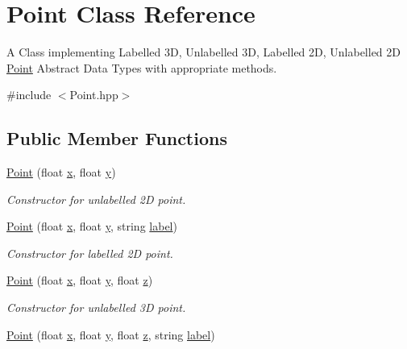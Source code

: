 \hypertarget{class_point}{}\section{Point Class Reference}
\label{class_point}


A Class implementing Labelled 3D, Unlabelled 3D, Labelled 2D, Unlabelled 2D \mbox{\hyperlink{class_point}{Point}} Abstract Data Types with appropriate methods.  




{\ttfamily \#include $<$Point.\+hpp$>$}

\subsection*{Public Member Functions}
\begin{DoxyCompactItemize}
\item 
\mbox{\hyperlink{class_point_a30bc8409287de4f43e160664be834636}{Point}} (float \mbox{\hyperlink{class_point_a05dfe2dfbde813ad234b514f30e662f1}{x}}, float \mbox{\hyperlink{class_point_a6101960c8d2d4e8ea1d32c9234bbeb8d}{y}})
\begin{DoxyCompactList}\small\item\em Constructor for unlabelled 2D point. \end{DoxyCompactList}\item 
\mbox{\hyperlink{class_point_aede82dc8eff80efec382853ecd2d31b0}{Point}} (float \mbox{\hyperlink{class_point_a05dfe2dfbde813ad234b514f30e662f1}{x}}, float \mbox{\hyperlink{class_point_a6101960c8d2d4e8ea1d32c9234bbeb8d}{y}}, string \mbox{\hyperlink{class_point_a1e929419353f9bec46732af977adb55a}{label}})
\begin{DoxyCompactList}\small\item\em Constructor for labelled 2D point. \end{DoxyCompactList}\item 
\mbox{\hyperlink{class_point_a405838cb39b8fb6119633d9ba7e6b4fb}{Point}} (float \mbox{\hyperlink{class_point_a05dfe2dfbde813ad234b514f30e662f1}{x}}, float \mbox{\hyperlink{class_point_a6101960c8d2d4e8ea1d32c9234bbeb8d}{y}}, float \mbox{\hyperlink{class_point_a9a666531e0e99adff132be93d2407d0c}{z}})
\begin{DoxyCompactList}\small\item\em Constructor for unlabelled 3D point. \end{DoxyCompactList}\item 
\mbox{\hyperlink{class_point_a1336b3425f9c080d170f036c336eaa64}{Point}} (float \mbox{\hyperlink{class_point_a05dfe2dfbde813ad234b514f30e662f1}{x}}, float \mbox{\hyperlink{class_point_a6101960c8d2d4e8ea1d32c9234bbeb8d}{y}}, float \mbox{\hyperlink{class_point_a9a666531e0e99adff132be93d2407d0c}{z}}, string \mbox{\hyperlink{class_point_a1e929419353f9bec46732af977adb55a}{label}})

\end{DoxyCompactItemize}
